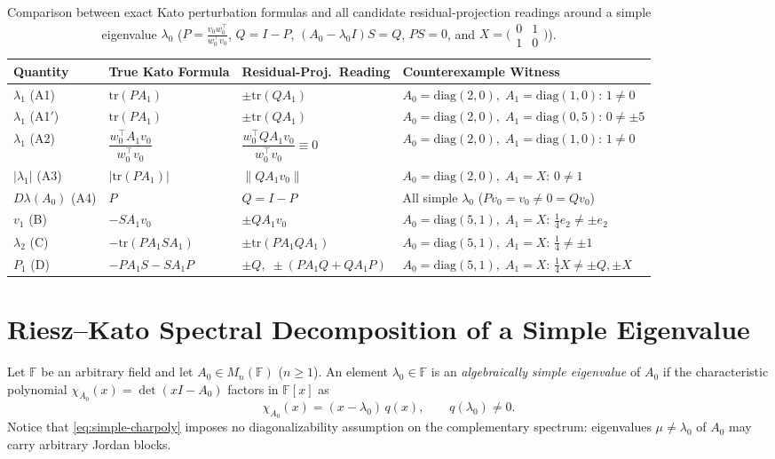 \documentclass[11pt,a4paper]{article}
\theoremstyle{definition}
\newcommand{\tr}{\mathrm{tr}}
\newcommand{\diag}{\mathrm{diag}}
\begin{document}
\begin{table}[ht]
\centering
\footnotesize
\setlength{\tabcolsep}{3.8pt}
\begin{tabular}{llll}
\hline
\textbf{Quantity} & \textbf{True Kato Formula} &
\textbf{Residual-Proj.\ Reading} & \textbf{Counterexample Witness} \\
\hline
$\lambda_1$ (A1) & $\tr(P A_1)$ & $\pm\tr(Q A_1)$ &
$A_0=\diag(2,0),\; A_1=\diag(1,0)$: $1 \neq 0$ \\
$\lambda_1$ (A1$'$) & $\tr(P A_1)$ & $\pm\tr(Q A_1)$ &
$A_0=\diag(2,0),\; A_1=\diag(0,5)$: $0 \neq \pm 5$ \\
$\lambda_1$ (A2) & $\dfrac{w_0^\top A_1 v_0}{w_0^\top v_0}$ &
$\dfrac{w_0^\top Q A_1 v_0}{w_0^\top v_0} \equiv 0$ &
$A_0=\diag(2,0),\; A_1=\diag(1,0)$: $1 \neq 0$ \\
$|\lambda_1|$ (A3) & $|\tr(P A_1)|$ & $\|Q A_1 v_0\|$ &
$A_0=\diag(2,0),\; A_1=X$: $0 \neq 1$ \\
$D\lambda(A_0)$ (A4) & $P$ & $Q = I - P$ &
All simple $\lambda_0$ ($P v_0 = v_0 \neq 0 = Q v_0$) \\
$v_1$ (B) & $- S A_1 v_0$ & $\pm Q A_1 v_0$ &
$A_0=\diag(5,1),\; A_1=X$: $\frac{1}{4}e_2 \neq \pm e_2$ \\
$\lambda_2$ (C) & $-\tr(P A_1 S A_1)$ & $\pm\tr(P A_1 Q A_1)$ &
$A_0=\diag(5,1),\; A_1=X$: $\frac{1}{4} \neq \pm 1$ \\
$P_1$ (D) & $- P A_1 S - S A_1 P$ & $\pm Q,\; \pm(P A_1 Q + Q A_1 P)$ &
$A_0=\diag(5,1),\; A_1=X$: $\frac{1}{4}X \neq \pm Q, \pm X$ \\
\hline
\end{tabular}
\caption{Comparison between exact Kato perturbation formulas and all candidate
residual-projection readings around a simple eigenvalue $\lambda_0$ ($P =
\frac{v_0 w_0^\top}{w_0^\top v_0}$, $Q = I - P$, $(A_0 - \lambda_0 I)S = Q$, $PS = 0$,
and $X = \bigl(\begin{smallmatrix} 0 & 1 \\ 1 & 0 \end{smallmatrix}\bigr)$).}
\label{tab:summary}
\end{table}

\section{Riesz--Kato Spectral Decomposition of a Simple Eigenvalue}

Let $\mathbb{F}$ be an arbitrary field and let $A_0 \in M_n(\mathbb{F})$ ($n \ge 1$).
An element $\lambda_0 \in \mathbb{F}$ is an \emph{algebraically simple eigenvalue} of
$A_0$ if the characteristic polynomial $\chi_{A_0}(x) = \det(x I - A_0)$ factors in
$\mathbb{F}[x]$ as
\begin{equation}\label{eq:simple-charpoly}
  \chi_{A_0}(x) = (x - \lambda_0)\, q(x), \qquad q(\lambda_0) \neq 0.
\end{equation}
Notice that \eqref{eq:simple-charpoly} imposes no diagonalizability assumption on the
complementary spectrum: eigenvalues $\mu \neq \lambda_0$ of $A_0$ may carry arbitrary
Jordan blocks.
\end{document}
